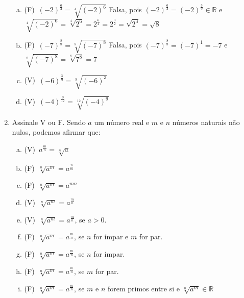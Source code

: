 \documentclass[a4paper,14pt]{article}
\begin{document}
\begin{multicols}{2}
\begin{enumerate}
\begin{enumerate}[a)]
        	\item (F)~$(-2)^\frac{6}{4} = \sqrt[4]{(-2)^6}$ Falsa, pois $(-2)^\frac{6}{4} = (-2)^\frac{3}{2} \in \mathbb{R}$ e $\sqrt[4]{(-2)^6} = \sqrt[4]{2^6} = 2^\frac{6}{4} = 2^\frac{3}{2} = \sqrt{2^3} = \sqrt{8}$
        	\item (F)~$(-7)^\frac{8}{8} = \sqrt[8]{(-7)^8}$ Falsa, pois $(-7)^\frac{8}{8} = (-7)^1 = -7$ e $\sqrt[8]{(-7)^8} = \sqrt[8]{7^8} = 7$
        	\item (V)~$(-6)^\frac{3}{9} = \sqrt[9]{(-6)^3}$
        	\item (V)~$(-4)^\frac{9}{12} = \sqrt[12]{(-4)^9}$
        \end{enumerate}	
        \item Assinale V ou F. Sendo $a$ um número real e $m$ e $n$ números naturais não nulos, podemos afirmar que:
        \begin{enumerate}[a)]
        	\item (V)~$a^\frac{m}{n} = \sqrt[n]{a}$
        	\item (F)~$\sqrt[n]{a^m} = a^\frac{n}{m}$
        	\item (F)~$\sqrt[n]{a^m} = a^{mn}$
        	\item (V)~$\sqrt[n]{a^m} = a^\frac{m}{n}$
        	\item (V)~$\sqrt[n]{a^m} = a^\frac{m}{n}$, se $a > 0$.
        	\item (F)~$\sqrt[n]{a^m} = a^\frac{m}{n}$, se $n$ for ímpar e $m$ for par.
        	\item (F)~$\sqrt[n]{a^m} = a^\frac{m}{n}$, se $n$ for ímpar.
        	\item (F)~$\sqrt[n]{a^m} = a^\frac{m}{n}$, se $m$ for par.
        	\item (F)~$\sqrt[n]{a^m} = a^\frac{m}{n}$, se $m$ e $n$ forem primos entre si e $\sqrt[n]{a^m} \in \mathbb{R}$
        \end{enumerate}
    \end{enumerate}        
    \end{multicols}    
\end{document}
